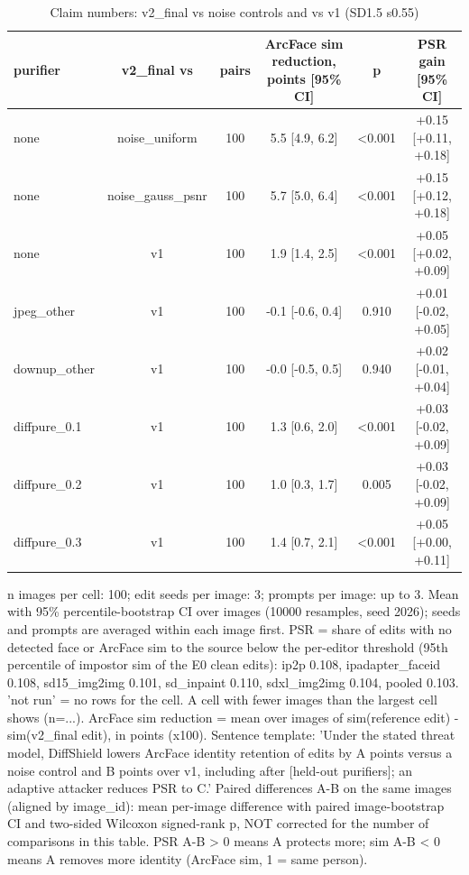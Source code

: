 \begin{table}[t]
\centering
\small
\begin{tabular}{lccccc}
\toprule
purifier & v2\_final vs & pairs & ArcFace sim reduction, points [95\% CI] & p & PSR gain [95\% CI] \\
\midrule
none & noise\_uniform & 100 & 5.5 [4.9, 6.2] & <0.001 & +0.15 [+0.11, +0.18] \\
none & noise\_gauss\_psnr & 100 & 5.7 [5.0, 6.4] & <0.001 & +0.15 [+0.12, +0.18] \\
none & v1 & 100 & 1.9 [1.4, 2.5] & <0.001 & +0.05 [+0.02, +0.09] \\
jpeg\_other & v1 & 100 & -0.1 [-0.6, 0.4] & 0.910 & +0.01 [-0.02, +0.05] \\
downup\_other & v1 & 100 & -0.0 [-0.5, 0.5] & 0.940 & +0.02 [-0.01, +0.04] \\
diffpure\_0.1 & v1 & 100 & 1.3 [0.6, 2.0] & <0.001 & +0.03 [-0.02, +0.09] \\
diffpure\_0.2 & v1 & 100 & 1.0 [0.3, 1.7] & 0.005 & +0.03 [-0.02, +0.09] \\
diffpure\_0.3 & v1 & 100 & 1.4 [0.7, 2.1] & <0.001 & +0.05 [+0.00, +0.11] \\
\bottomrule
\end{tabular}
\caption{Claim numbers: v2\_final vs noise controls and vs v1 (SD1.5 s0.55)}
\label{tab:claims}
\par\footnotesize n images per cell: 100; edit seeds per image: 3; prompts per image: up to 3. Mean with 95\% percentile-bootstrap CI over images (10000 resamples, seed 2026); seeds and prompts are averaged within each image first. PSR = share of edits with no detected face or ArcFace sim to the source below the per-editor threshold (95th percentile of impostor sim of the E0 clean edits): ip2p 0.108, ipadapter\_faceid 0.108, sd15\_img2img 0.101, sd\_inpaint 0.110, sdxl\_img2img 0.104, pooled 0.103. 'not run' = no rows for the cell. A cell with fewer images than the largest cell shows (n=...). ArcFace sim reduction = mean over images of sim(reference edit) - sim(v2\_final edit), in points (x100). Sentence template: 'Under the stated threat model, DiffShield lowers ArcFace identity retention of edits by A points versus a noise control and B points over v1, including after [held-out purifiers]; an adaptive attacker reduces PSR to C.' Paired differences A-B on the same images (aligned by image\_id): mean per-image difference with paired image-bootstrap CI and two-sided Wilcoxon signed-rank p, NOT corrected for the number of comparisons in this table. PSR A-B > 0 means A protects more; sim A-B < 0 means A removes more identity (ArcFace sim, 1 = same person).
\end{table}
